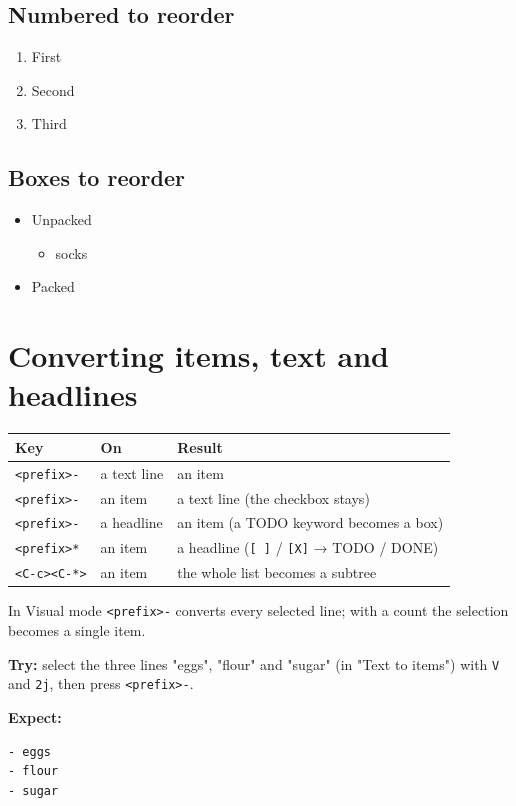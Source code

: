 \subsection{Numbered to reorder}
\label{sec:org4f0e106}
\begin{enumerate}
\item First
\item Second
\item Third
\end{enumerate}
\subsection{Boxes to reorder}
\label{sec:orgd2d6e17}
\begin{itemize}
\item[{$\square$}] Unpacked
\begin{itemize}
\item[{$\square$}] socks
\end{itemize}
\item[{$\boxtimes$}] Packed
\end{itemize}
\section{Converting items, text and headlines}
\label{sec:org15303e2}
\begin{center}
\begin{tabular}{lll}
Key & On & Result\\
\hline
\texttt{<prefix>-} & a text line & an item\\
\texttt{<prefix>-} & an item & a text line (the checkbox stays)\\
\texttt{<prefix>-} & a headline & an item (a TODO keyword becomes a box)\\
\texttt{<prefix>*} & an item & a headline (\texttt{[ ]} / \texttt{[X]} → TODO / DONE)\\
\texttt{<C-c><C-*>} & an item & the whole list becomes a subtree\\
\end{tabular}
\end{center}

In Visual mode \texttt{<prefix>-} converts every selected line; with a count the
selection becomes a single item.

\textbf{Try:} select the three lines "eggs", "flour" and "sugar" (in "Text to
items") with \texttt{V} and \texttt{2j}, then press \texttt{<prefix>-}.

\textbf{Expect:}
\begin{verbatim}
- eggs
- flour
- sugar
\end{verbatim}

